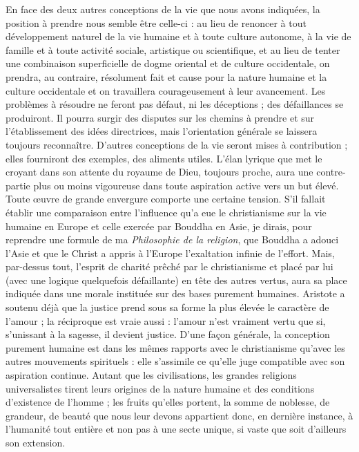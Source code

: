 \documentclass[12pt,a4paper]{article}
\newcommand{\opage}[1]{\marginnote{\footnotesize\textit{[#1]}}}
\begin{document}
En face des deux autres conceptions de la vie que nous avons indiquées,
la position à prendre nous semble être celle-ci : au lieu de renoncer
à tout développement naturel de la vie humaine et à toute culture
autonome, à la vie de famille et à toute activité sociale, artistique ou
scientifique, et au lieu de tenter une combinaison superficielle de
\opage{244} dogme oriental et de culture occidentale, on prendra, au contraire,
résolument fait et cause pour la nature humaine et la culture occidentale
et on travaillera courageusement à leur avancement. Les
problèmes à résoudre ne feront pas défaut, ni les déceptions ; des
défaillances se produiront. Il pourra surgir des disputes sur les
chemins à prendre et sur l'établissement des idées directrices, mais
l'orientation générale se laissera toujours reconnaître. D'autres conceptions
de la vie seront mises à contribution ; elles fourniront des
exemples, des aliments utiles. L'élan lyrique que met le croyant
dans son attente du royaume de Dieu, toujours proche, aura une
contre-partie plus ou moins vigoureuse dans toute aspiration active
vers un but élevé. Toute œuvre de grande envergure comporte une
certaine tension. S'il fallait établir une comparaison entre l'influence
qu'a eue le christianisme sur la vie humaine en Europe et
celle exercée par Bouddha en Asie, je dirais, pour reprendre une
formule de ma \emph{Philosophie de la religion}, que Bouddha a adouci
l'Asie et que le Christ a appris à l'Europe l'exaltation infinie de l'effort.
Mais, par-dessus tout, l'esprit de charité prêché par le christianisme
et placé par lui (avec une logique quelquefois défaillante) en
tête des autres vertus, aura sa place indiquée dans une morale
instituée sur des bases purement humaines. Aristote a soutenu
déjà que la justice prend sous sa forme la plus élevée le caractère
de l'amour ; la réciproque est vraie aussi : l'amour n'est vraiment
vertu que si, s'unissant à la sagesse, il devient justice. D'une façon
générale, la conception purement humaine est dans les mêmes rapports
avec le christianisme qu'avec les autres mouvements spirituels :
elle s'assimile ce qu'elle juge compatible avec son aspiration
continue. Autant que les civilisations, les grandes religions universalistes
tirent leurs origines de la nature humaine et des conditions
d'existence de l'homme ; les fruits qu'elles portent, la somme de
noblesse, de grandeur, de beauté que nous leur devons appartient
donc, en dernière instance, à l'humanité tout entière et non pas à
une secte unique, si vaste que soit d'ailleurs son extension.
\end{document}
